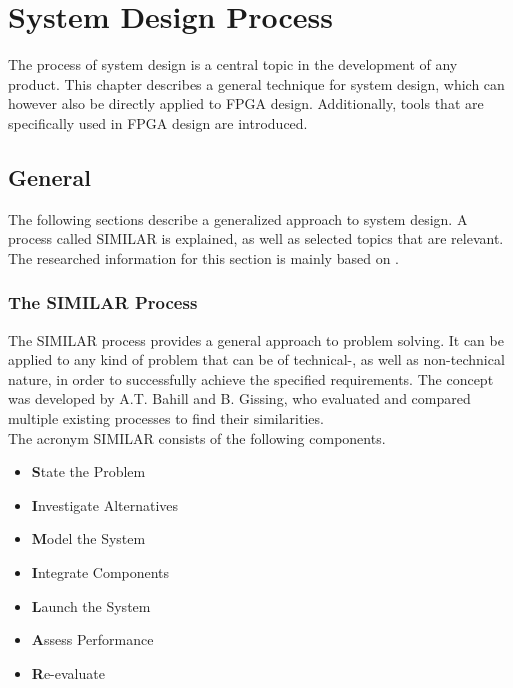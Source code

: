 \chapter{System Design Process}
\label{cha:SystemDesignProcess}

The process of system design is a central topic in the development of any product.
This chapter describes a general technique for system design, which can however also be directly applied to FPGA design.
Additionally, tools that are specifically used in FPGA design are introduced.

\section{General}

The following sections describe a generalized approach to system design.
A process called SIMILAR is explained, as well as selected topics that are relevant.
The researched information for this section is mainly based on \cite{BahillA.Terry2017TDiS}.

\subsection{The SIMILAR Process}
\label{sec:SimilarProcess}

The SIMILAR process provides a general approach to problem solving.
It can be applied to any kind of problem that can be of technical-, as well as non-technical nature, in order to successfully achieve the specified requirements.
The concept was developed by A.T. Bahill and B. Gissing, who evaluated and compared multiple existing processes to find their similarities.\\

\noindent
The acronym SIMILAR consists of the following components.

\begin{itemize}
  \item \textbf{S}tate the Problem
  \item \textbf{I}nvestigate Alternatives
  \item \textbf{M}odel the System
  \item \textbf{I}ntegrate Components
  \item \textbf{L}aunch the System
  \item \textbf{A}ssess Performance
  \item \textbf{R}e-evaluate\\
\end{itemize}

